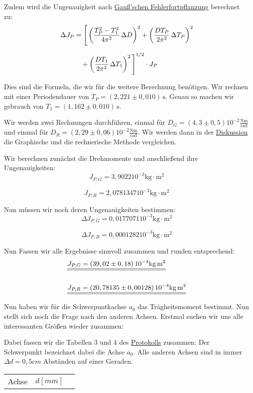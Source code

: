 Zudem wird die Ungenauigkeit nach \hyperref[eq:gauss_fehlfortpflanzung]{Gauß'schen Fehlerfortpflanzung} berechnet zu:
\begin{align}
\Delta J_P &= \Bigg[
    \left( \frac{T_P^2 - T_1^2}{4\pi^2} \, \Delta D \right)^2
    + \left( \frac{D T_P}{2\pi^2} \, \Delta T_P \right)^2 \notag \\[6pt]
&\quad
    + \left( \frac{D T_1}{2\pi^2} \, \Delta T_1 \right)^2
\Bigg]^{1/2} \cdot J_P
\end{align}

Dies sind die Formeln, die wir für die weitere Berechnung benötigen. Wir rechnen mit einer Periodendauer von $T_P = (2,221 \pm 0,010)\, \mathrm{s}$.
Genau so machen wir gebrauch von $T_1 = (1,162 \pm 0,010)\, \mathrm{s}$.

Wir werden zwei Rechnungen durchführen, einmal für $D_G =(4,3 \pm 0,5) 10^{-2} \mathrm{\frac{Nm}{rad}}$ und einmal für
$D_R =(2,29 \pm 0,06) 10^{-2} \mathrm{\frac{Nm}{rad}}$. Wir werden dann in der \hyperref[Diskussion]{Diskussion} die Graphische und die rechnerische Methode vergleichen.

Wir berechnen zunächst die Drehmomente und anschließend ihre Ungenauigkeiten:
\begin{equation}
    J_{P,G} = 3,9022 \mathrm{10^{-3} kg \cdot m^2}
    \label{eq:J_P_G}
\end{equation}

\begin{equation}
    J_{P,R} = 2,0781347 \mathrm{10^{-3} kg \cdot m^2}
    \label{eq:J_P_R}
\end{equation}

Nun müssen wir noch deren Ungenauigkeiten bestimmen:
\begin{equation}
    \Delta J_{P,G} = 0,0177071 \mathrm{10^{-3} kg \cdot m^2}
\end{equation}

\begin{equation}
    \Delta J_{P,R} = 0,0001282 \mathrm{10^{-3} kg \cdot m^2}
\end{equation}

Nun Fassen wir alle Ergebnisse sinnvoll zusammen und runden entsprechend: 
\begin{align}
    &\underline{\underline{J_{P,G} = (39,02 \pm 0,18)\, \mathrm{10^{-4}kg \, m^2}}} \\
        \notag \\
    &\underline{\underline{J_{P,R} = (20,78135 \pm 0,00128)\, \mathrm{10^{-4} kg \, m^2}}}
\end{align}

Nun haben wir für die Schwerpuntkachse $a_0$ das Trägheitsmoment bestimmt. Nun stellt sich noch die Frage nach den anderen Achsen. Erstmal suchen wir uns alle interessanten Größen wieder zusammen:

Dabei fassen wir die Tabellen 3 und 4 des \hyperref[Protokoll]{Protokolls} zusammen:
Der Schwerpunkt bezeichnet dabei die Achse $a_0$. Alle anderen Achsen sind in immer $\Delta d = 0,5cm$ Abständen auf einer Geraden.
\begin{table}
    \begin{tabular}{c | c | c}
        Achse & $d [mm]$ & 
    \end{tabular}
\end{table}